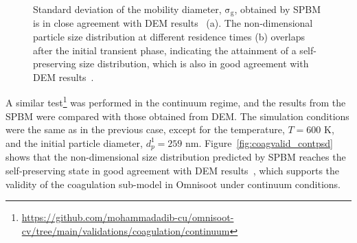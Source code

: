 \begin{figure}[H]
\begin{subfigure}[t]{0.4\textwidth}
	\end{subfigure}
	\caption{Standard deviation of the mobility diameter, $\mathrm{\sigma_g}$, obtained by SPBM is in close agreement with DEM results~\citep{kholghy2021surface} (a). The non-dimensional particle size distribution at different residence times (b) overlaps after the initial transient phase, indicating the attainment of a self-preserving size distribution, which is also in good agreement with DEM results~\citep{goudeli2015coagulation}.}
	\label{fig:coagvalid_sigmapsd} 
\end{figure}

A similar test\footnote{\href{https://github.com/mohammadadib-cu/omnisoot-cv/tree/main/validations/coagulation/continuum}{https://github.com/mohammadadib-cu/omnisoot-cv/tree/main/validations/coagulation/continuum}} was performed in the continuum regime, and the results from the SPBM were compared with those obtained from DEM. The simulation conditions were the same as in the previous case, except for the temperature, $T = 600$ K, and the initial particle diameter, $d^1_p = 259$ nm. Figure~\ref{fig:coagvalid_contpsd} shows that the non-dimensional size distribution predicted by SPBM reaches the self-preserving state in good agreement with DEM results~\citep{goudeli2015coagulation}, which supports the validity of the coagulation sub-model in Omnisoot under continuum conditions.

